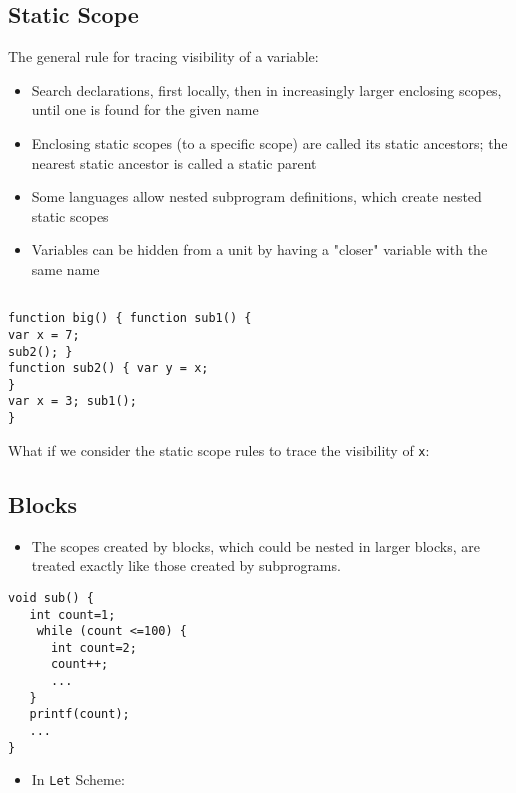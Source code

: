 \documentclass[11pt]{article}
\begin{document}
\subsection{Static Scope}
\label{sec:org272fbdd}

The general rule for tracing visibility of a variable:

\begin{itemize}
\item Search declarations, first locally, then in increasingly larger enclosing
scopes, until one is found for the given name

\item Enclosing static scopes (to a specific scope) are called its static ancestors;
the nearest static ancestor is called a static parent

\item Some languages allow nested subprogram definitions, which create nested static
scopes

\item Variables can be hidden from a unit by having a "closer" variable with the
same name
\end{itemize}


\begin{verbatim}

function big() { function sub1() {
var x = 7;
sub2(); }
function sub2() { var y = x;
}
var x = 3; sub1();
}
\end{verbatim}

What if we consider the static scope rules to trace the visibility of \texttt{x}:

\subsection{Blocks}
\label{sec:org2f98579}

\begin{itemize}
\item The scopes created by blocks, which could be nested in larger blocks, are
treated exactly like those created by subprograms.
\end{itemize}

\begin{verbatim}
void sub() {
   int count=1;
    while (count <=100) {
      int count=2;
      count++;
      ...
   }
   printf(count);
   ...
}
\end{verbatim}



\begin{itemize}
\item In \texttt{Let} Scheme:
\end{itemize}
\end{document}
